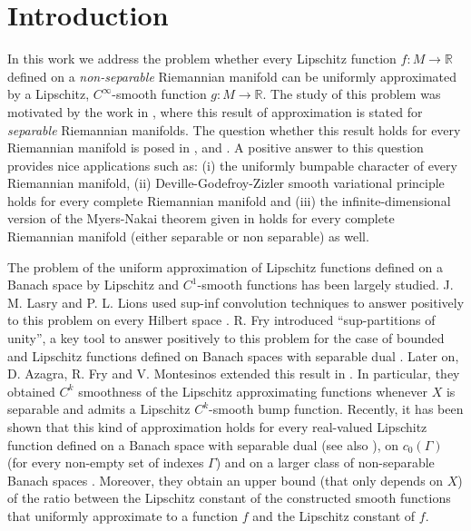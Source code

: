\documentclass[11pt]{amsart}
\numberwithin{equation}{section}
\begin{document}
\section{Introduction}
In this work we address the problem whether every Lipschitz function $f:M\rightarrow \mathbb R$ defined on a {\em non-separable} Riemannian
manifold  can be uniformly approximated by  a Lipschitz, $C^\infty$-smooth function $g:M\rightarrow \mathbb R$.
The study of this problem was motivated  by the work  in \cite{AzFeMeRa},
where this result of approximation is stated for   {\em separable}
Riemannian manifolds. The question whether this result holds for every Riemannian manifold is posed in  \cite{AzFeMe}, \cite{AzFeMeRa} and \cite{GaJaRa}.
 A positive answer to this question provides nice applications such as: (i)  the uniformly bumpable character of every Riemannian manifold,  (ii) Deville-Godefroy-Zizler smooth variational principle  holds for every complete  Riemannian manifold \cite{AzFeMe} and (iii) the infinite-dimensional version of the Myers-Nakai theorem given in \cite{GaJaRa}   holds for every complete Riemannian manifold
 (either separable or non separable) as well.

The problem of the  uniform approximation of  Lipschitz functions defined
on a Banach space by Lipschitz and $C^1$-smooth functions  has been largely studied. J. M. Lasry and P. L. Lions used sup-inf convolution techniques to answer positively to this problem on every Hilbert space  \cite{LL}. R. Fry introduced
``sup-partitions of unity'', a key tool  to answer positively to this problem for the case of bounded and  Lipschitz functions defined on
 Banach spaces with separable dual \cite{Fry1}. Later on,  D. Azagra, R. Fry and V. Montesinos extended this result in \cite{azafrymon}. In particular,
 they obtained $C^k$ smoothness of the Lipschitz approximating functions whenever  $X$ is separable and admits a Lipschitz $C^{k}$-smooth bump function.
 Recently, it has been shown that this kind of approximation holds for every real-valued Lipschitz function defined on  a Banach space with separable dual \cite{HajekJohanis} (see also  \cite[Lemma 1]{Azafrykeener}),    on $c_0(\Gamma)$ (for every non-empty set of indexes $\Gamma$) \cite{HajJohc0} and on a larger class of non-separable Banach spaces \cite{HajekJohanis}. Moreover, they obtain an upper bound (that only depends on $X$) of the ratio between the Lipschitz constant of the constructed smooth functions that uniformly approximate to a function $f$ and the Lipschitz constant of $f$.
\end{document}
